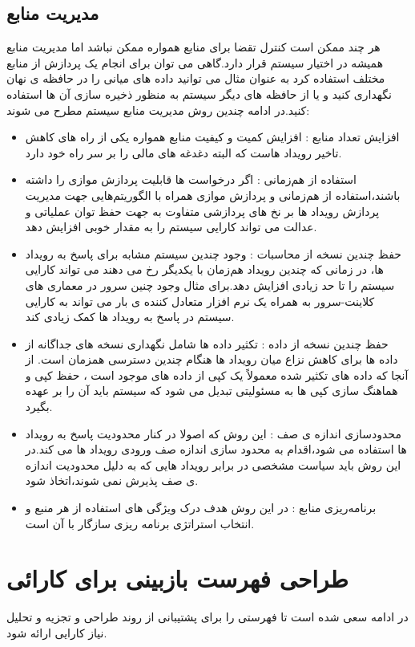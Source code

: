 \subsection{مدیریت منابع}
هر چند ممکن است کنترل تقضا برای منابع همواره ممکن نباشد اما مدیریت منابع همیشه در اختیار سیستم قرار دارد.گاهی می توان برای انجام یک پردازش از منابع مختلف استفاده کرد به عنوان مثال می توانید داده های میانی را در حافظه ی نهان نگهداری کنید و یا از حافظه های دیگر سیستم به منظور ذخیره سازی آن ها استفاده کنید.در ادامه چندین روش مدیریت منابع سیستم مطرح می شوند:
\begin{itemize}
\item
افزایش تعداد منابع : افزایش کمیت و کیفیت منابع همواره یکی از راه های کاهش تاخیر رویداد هاست که البته دغدغه های مالی را بر سر راه خود دارد.
\item 
استفاده از هم‌زمانی : اگر درخواست ها قابلیت پردازش موازی را داشته باشند،‌استفاده از هم‌زمانی و پردازش موازی همراه با الگوریتم‌هایی جهت مدیریت پردازش رویداد ها بر نخ های پردازشی متفاوت به جهت حفظ توان عملیاتی و عدالت می تواند کارایی سیستم را به مقدار خوبی افزایش دهد.
\item
حفظ چندین نسخه از محاسبات : وجود چندین سیستم مشابه برای پاسخ به رویداد ها، در زمانی که چندین رویداد هم‌زمان با یکدیگر رخ می دهند می تواند کارایی سیستم را تا حد زیادی افزایش دهد.برای مثال وجود چنین سرور در معماری های کلاینت-سرور به همراه یک نرم افزار متعادل کننده ی بار می تواند به کارایی سیستم در پاسخ به رویداد ها کمک زیادی کند.
\item 
حفظ چندین نسخه از داده : تکثیر داده ها شامل نگهداری نسخه های جداگانه از داده ها برای کاهش نزاع میان رویداد ها هنگام چندین دسترسی همزمان است. از آنجا که داده های تکثیر شده معمولاً یک کپی از داده های موجود است ، حفظ کپی و هماهنگ سازی کپی ها به مسئولیتی تبدیل می شود که سیستم باید آن را بر عهده بگیرد.
\item
محدود‌سازی اندازه ی صف : این روش که اصولا در کنار محدودیت پاسخ به رویداد ها استفاده می شود،‌اقدام به محدود سازی اندازه صف ورودی رویداد ها می کند.در این روش باید سیاست مشخصی در برابر رویداد هایی که به دلیل محدودیت اندازه ی صف پذیرش نمی شوند،‌اتخاذ شود.
\item
برنامه‌ریزی منابع : در این روش هدف درک ویژگی های استفاده از هر منبع و انتخاب استراتژی برنامه ریزی سازگار با آن است.
\end{itemize}
\section{طراحی فهرست بازبینی برای کارائی}
در ادامه سعی شده است تا فهرستی را برای پشتیبانی از روند طراحی 	و تجزیه و تحلیل نیاز کارایی ارائه شود.
